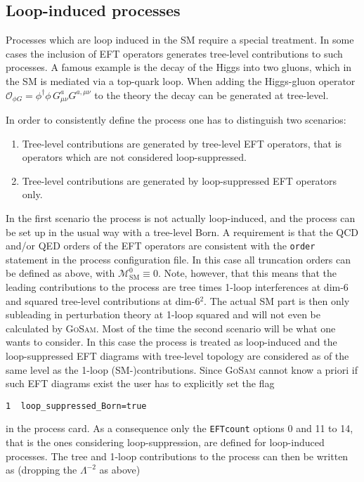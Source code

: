 \documentclass[11pt,a4paper]{refrep}
\newcommand{\gosam}{\textsc{GoSam}\xspace}
\def\M{\mathcal{M}}
\begin{document}
\subsection{Loop-induced processes}\label{sec:loop-induced}
Processes which are loop induced in the SM require a special treatment. In some cases the inclusion of EFT operators generates tree-level contributions to such processes. A famous example is the decay of the Higgs into two gluons, which in the SM is mediated via a top-quark loop. When adding the Higgs-gluon operator $\mathcal{O}_{\phi G} = \phi^\dagger\phi\,G^a_{\mu\nu}G^{a,\mu\nu}$ to the theory the decay can be generated at tree-level.

In order to consistently define the process one has to distinguish two scenarios:
\begin{enumerate}
   \item Tree-level contributions are generated by tree-level EFT operators, that is operators which are not considered loop-suppressed.
   \item Tree-level contributions are generated by loop-suppressed EFT operators only.
\end{enumerate}
In the first scenario the process is not actually loop-induced, and the process can be set up in the usual way with a tree-level Born. A requirement is that the QCD and/or QED orders of the EFT operators are consistent with the \texttt{order} statement in the process configuration file. In this case all truncation orders can be defined as above, with $\M_\mathrm{SM}^0\equiv0$. Note, however, that this means that the leading contributions to the process are tree times 1-loop interferences at dim-6 and squared tree-level contributions at dim-6$^2$. The actual SM part is then only subleading in perturbation theory at 1-loop squared and will not even be calculated by \gosam. Most of the time the second scenario will be what one wants to consider. In this case the process is treated as loop-induced and the loop-suppressed EFT diagrams with tree-level topology are considered as of the same level as the 1-loop (SM-)contributions. Since \gosam cannot know a priori if such EFT diagrams exist the user has to explicitly set the flag
\begin{lstlisting}[gobble=3,style=py]
1  loop_suppressed_Born=true
\end{lstlisting}
in the process card. As a consequence only the \texttt{EFTcount} options 0 and 11 to 14, that is the ones considering loop-suppression, are defined for loop-induced processes. The tree and 1-loop contributions to the process can then be written as (dropping the $\Lambda^{-2}$ as above)
\end{document}
